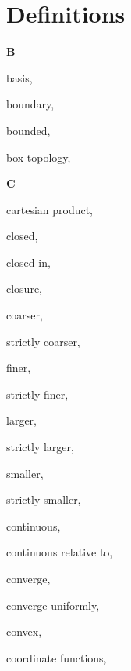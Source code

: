 \section*{Definitions}

\begin{multicols}{2}

\vspace{1em}\noindent\large{\textbf{B}}

basis, \pageref{def:Basis}

boundary, \pageref{def:Boundary}

bounded, \pageref{def:Bounded}

box topology, \pageref{def:BoxTopology}

\vspace{1em}\noindent\large{\textbf{C}}

cartesian product, \pageref{def:CartesianProduct}

closed, \pageref{def:Closed}

\hspace{1em}closed in, \pageref{def:ClosedIn}

closure, \pageref{def:Closure}

coarser, \pageref{def:Comparable}

\hspace{1em}strictly coarser, \pageref{def:Comparable}

finer, \pageref{def:Comparable}

\hspace{1em}strictly finer, \pageref{def:Comparable}

larger, \pageref{def:Comparable}

\hspace{1em}strictly larger, \pageref{def:Comparable}

smaller, \pageref{def:Comparable}

\hspace{1em}strictly smaller, \pageref{def:Comparable}

continuous, \pageref{def:Continuous}

\hspace{1em}continuous relative to, \pageref{def:ContinuousRelativeTo}

converge, \pageref{def:Converge}

converge uniformly, \pageref{def:ConvergeUniformly}

convex, \pageref{def:Convex}

coordinate functions, \pageref{def:CoordinateFunctions}


\end{multicols}
